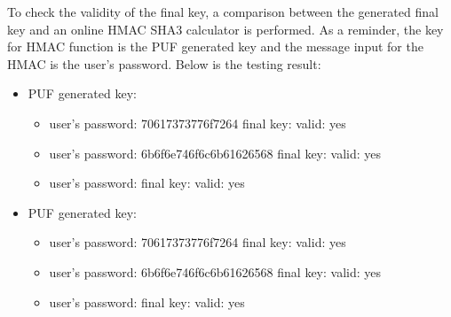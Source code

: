 To check the validity of the final key, a comparison between the generated final key and an online HMAC SHA3 calculator \cite{hmac_calculator} is performed. As a reminder, the key for HMAC function is the PUF generated key and the message input for the HMAC is the user's password. Below is the testing result:
\begin{itemize}
  \item PUF generated key: 
  \begin{itemize}
    \item user's password: 70617373776f7264\newline
    final key: \newline
    valid: yes
    \item user's password: 6b6f6e746f6c6b61626568\newline
    final key: \newline
    valid: yes
    \item user's password: \newline
    final key: \newline
    valid: yes
  \end{itemize}
  \item PUF generated key: 
  \begin{itemize}
    \item user's password: 70617373776f7264\newline
    final key: \newline
    valid: yes
    \item user's password: 6b6f6e746f6c6b61626568\newline
    final key: \newline
    valid: yes
    \item user's password: \newline
    final key: \newline
    valid: yes
  \end{itemize}
\end{itemize}

